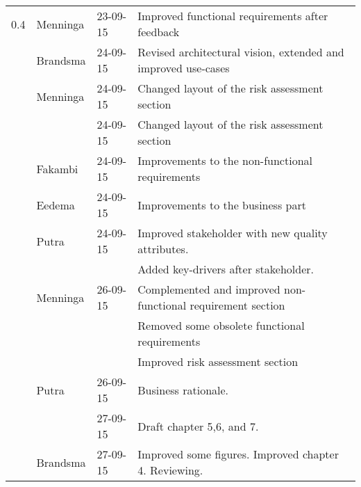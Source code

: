 \begin{longtable}{L{} L{} L{} L{}}
    0.4 & Menninga  & 23-09-15 & Improved functional requirements after feedback  \\
        & Brandsma  & 24-09-15 & Revised architectural vision, extended and improved use-cases \\
        & Menninga  & 24-09-15 & Changed layout of the risk assessment section \\
        &           & 24-09-15 & Changed layout of the risk assessment section \\
        & Fakambi   & 24-09-15 & Improvements to the non-functional requirements \\
        & Eedema    & 24-09-15 & Improvements to the business part \\
        & Putra     & 24-09-15 & Improved stakeholder with new quality attributes. \\
        &           &          & Added key-drivers after stakeholder. \\
        & Menninga  & 26-09-15 & Complemented and improved non-functional requirement section \\
                    &          &          & Removed some obsolete functional requirements \\
                    &          &          & Improved risk assessment section \\
        & Putra     & 26-09-15 & Business rationale. \\
        &           & 27-09-15 & Draft chapter 5,6, and 7.\\
        & Brandsma  & 27-09-15 & Improved some figures. Improved chapter 4. Reviewing. \\
    \midrule


\end{longtable}
